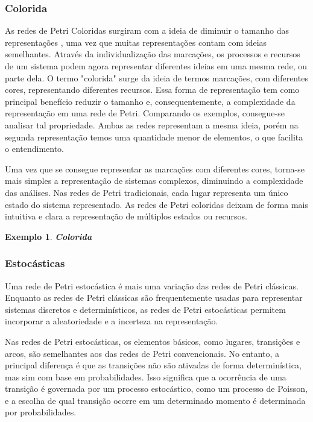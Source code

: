 \documentclass[
	12pt,				%
	openright,			%
	oneside,			%
	a4paper,			%
	english,			%
	brazil				%
	]{abntex2}
\newtheorem{exemplo}{Exemplo}
\begin{document}
\subsubsection*{Colorida}

As redes de Petri Coloridas surgiram com a ideia de diminuir o tamanho das representações \cite{frances2003introduccao}, uma vez que muitas representações contam com ideias semelhantes. Através da individualização das marcações, os processos e recursos de um sistema podem agora representar diferentes ideias em uma mesma rede, ou parte dela. O termo "colorida" surge da ideia de termos marcações, com diferentes cores, representando diferentes recursos. Essa forma de representação tem como principal benefício reduzir o tamanho e, consequentemente, a complexidade da representação em uma rede de Petri. Comparando os exemplos, consegue-se analisar tal propriedade. Ambas as redes representam a mesma ideia, porém na segunda representação temos uma quantidade menor de elementos, o que facilita o entendimento. 

Uma vez que se consegue representar as marcações com diferentes cores, torna-se mais simples a representação de sistemas complexos, diminuindo a complexidade das análises. Nas redes de Petri tradicionais, cada lugar representa um único estado do sistema representado. As redes de Petri coloridas deixam de forma mais intuitiva e clara a representação de múltiplos estados ou recursos. 

\begin{exemplo} \textbf{Colorida}
\label{exemplo_colorida}

\end{exemplo}

\subsubsection*{Estocásticas}

Uma rede de Petri estocástica é mais uma variação das redes de Petri clássicas. Enquanto as redes de Petri clássicas são frequentemente usadas para representar sistemas discretos e determinísticos, as redes de Petri estocásticas permitem incorporar a aleatoriedade e a incerteza na representação.

Nas redes de Petri estocásticas, os elementos básicos, como lugares, transições e arcos, são semelhantes aos das redes de Petri convencionais. No entanto, a principal diferença é que as transições não são ativadas de forma determinística, mas sim com base em probabilidades. Isso significa que a ocorrência de uma transição é governada por um processo estocástico, como um processo de Poisson, e a escolha de qual transição ocorre em um determinado momento é determinada por probabilidades.
\end{document}
